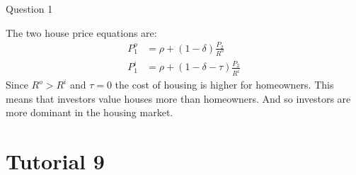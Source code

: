 \documentclass[a4paper]{article}
\newif\IfInSansMode
\begin{document}
\begin{questionbox}{Question 1}
\begin{enumerate}[(a)]
			\begin{explanationbox}
			The two house price equations are:
			\begin{align*}
				P_1^o &= \rho + (1 - \delta )\frac{P_2}{R^o} \\
				P_1^i &= \rho + (1 - \delta - \tau)\frac{P_2}{R^i}
			\end{align*}
			Since \( R^o > R^i \) and \( \tau = 0 \) the cost of housing is higher for homeowners. This means that investors value houses more than homeowners. And so investors are more dominant in the housing market.
			\end{explanationbox}
		\end{enumerate}
	\end{questionbox}
\section{Tutorial 9}
\end{document}
